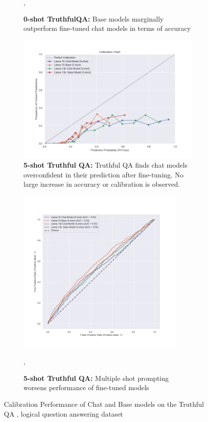 \documentclass[11pt]{article}
\begin{document}
\begin{figure}
\begin{subfigure}[b]{0.38\textwidth}
         \caption{\textbf{0-shot TruthfulQA:} Base models marginally outperform fine-tuned chat models 
         in terms of accuracy},
         \label{fig:0-shot-MMLU}
    \end{subfigure} 
     \hfill
     \begin{subfigure}[b]{0.60\textwidth}
         \centering
         \includegraphics[width=1.0\textwidth]{figures/5-shot-TruthQA.png}
         \caption{\textbf{5-shot Truthful QA:} Truthful QA finds chat models overconfident in their prediction after fine-tuning. No large increase in accuracy or calibration is observed.}
         \label{fig:5-shot-truthfulqa}
     \end{subfigure}    
     \hfill
    \begin{subfigure}[b]{0.38\textwidth}
         \centering \includegraphics[width=0.9\textwidth]{figures/5-shot-TruthfulQA-roc.png}
         \caption{\textbf{5-shot Truthful QA:}  Multiple shot prompting worsens performance of fine-tuned models},
         \label{fig:0-shot-MMLU}
    \end{subfigure} 
        \caption{Calibration Performance of Chat and Base models on the Truthful QA , logical question answering dataset}
        \label{fig:three graphs}
\end{figure}
\end{document}
